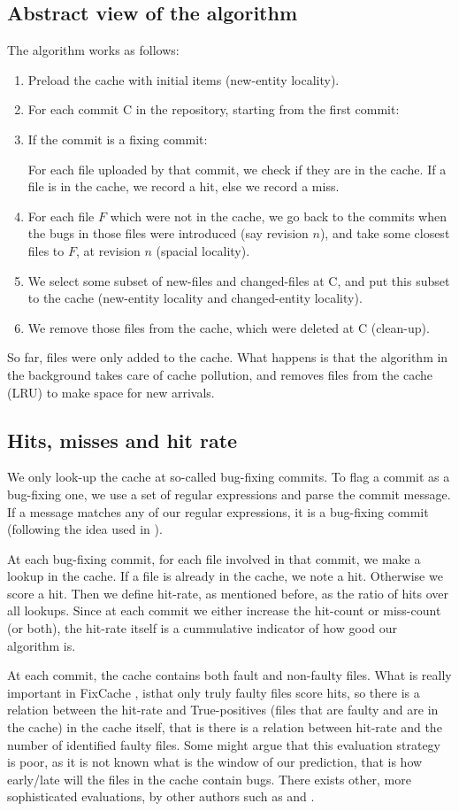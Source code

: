 \documentclass[12pt,twoside,notitlepage]{report}
\newcommand{\fxch}{FixCache }
\begin{document}
\subsection{Abstract view of the algorithm}
The algorithm works as follows:
\begin{enumerate}
	\item Preload the cache with initial items (new-entity locality).
	\item For each commit C in the repository, starting from the first commit:
	\item If the commit is a fixing commit:
		
	For each file uploaded by that commit, we check if they are in the cache. If a file is in the cache, we record a hit, else we record a miss.
	\item For each file $F$ which were not in the cache, we go back to the commits when the bugs in those files were introduced (say revision $n$), and take some closest files to $F$, at revision $n$ (spacial locality).
	\item We select some subset of new-files and changed-files at C, and put this subset to the cache (new-entity locality and changed-entity locality).
	\item We remove those files from the cache, which were deleted at C (clean-up).
\end{enumerate}
So far, files were only added to the cache. What happens is that the algorithm in the background takes care of cache pollution, and removes files from the cache (LRU) to make space for new arrivals.
\subsection{Hits, misses and hit rate}
We only look-up the cache at so-called bug-fixing commits. To flag a commit as a bug-fixing one, we use a set of regular expressions and parse the commit message. If a message matches any of our regular expressions, it is a bug-fixing commit (following the idea used in \cite{KimZim}).

At each bug-fixing commit, for each file involved in that commit, we make a lookup in the cache. If a file is already in the cache, we note a hit. Otherwise we score a hit. Then we define hit-rate, as mentioned before, as the ratio of hits over all lookups. Since at each commit we either increase the hit-count or miss-count (or both), the hit-rate itself is a cummulative indicator of how good our algorithm is. 

At each commit, the cache contains both fault and non-faulty files. What is really important in \fxch, isthat only truly faulty files score hits, so there is a relation between the hit-rate and True-positives (files that are faulty and are in the cache) in the cache itself, that is there is a relation between hit-rate and the number of identified faulty files. Some might argue that this evaluation strategy is poor, as it is not known what is the window of our prediction, that is how early/late will the files in the cache contain bugs. There exists other, more sophisticated evaluations, by other authors such as \cite{Sadowski} and \cite{Bugcache}.
\end{document}
